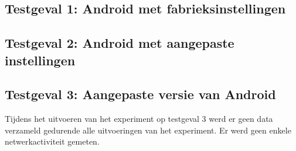 \subsection{Testgeval 1: Android met fabrieksinstellingen}

\subsection{Testgeval 2: Android met aangepaste instellingen}

\subsection{Testgeval 3: Aangepaste versie van Android}
Tijdens het uitvoeren van het experiment op testgeval 3 werd er geen data verzameld gedurende alle uitvoeringen van het experiment. Er werd geen enkele netwerkactiviteit gemeten.